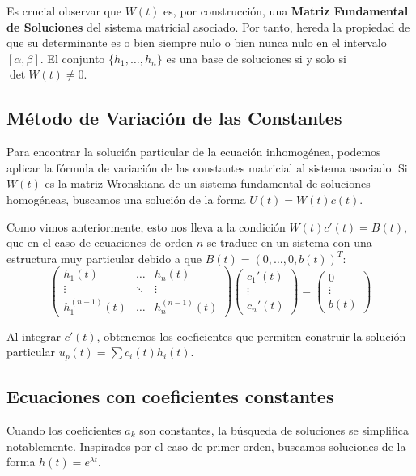 Es crucial observar que $W(t)$ es, por construcción, una \textbf{Matriz Fundamental de Soluciones} del sistema matricial asociado. Por tanto, hereda la propiedad de que su determinante es o bien siempre nulo o bien nunca nulo en el intervalo $[\alpha, \beta]$. El conjunto $\{h_1, \dots, h_n\}$ es una base de soluciones si y solo si $\det W(t) \neq 0$.

\subsection{Método de Variación de las Constantes}

Para encontrar la solución particular de la ecuación inhomogénea, podemos aplicar la fórmula de variación de las constantes matricial al sistema asociado. Si $W(t)$ es la matriz Wronskiana de un sistema fundamental de soluciones homogéneas, buscamos una solución de la forma $U(t) = W(t)c(t)$.

Como vimos anteriormente, esto nos lleva a la condición $W(t)c'(t) = B(t)$, que en el caso de ecuaciones de orden $n$ se traduce en un sistema con una estructura muy particular debido a que $B(t) = (0, \dots, 0, b(t))^T$:
\[
\begin{pmatrix} 
h_1(t) & \dots & h_n(t) \\ 
\vdots & \ddots & \vdots \\ 
h_1^{(n-1)}(t) & \dots & h_n^{(n-1)}(t) 
\end{pmatrix} \begin{pmatrix} c_1'(t) \\ \vdots \\ c_n'(t) \end{pmatrix} = \begin{pmatrix} 0 \\ \vdots \\ b(t) \end{pmatrix}
\]

Al integrar $c'(t)$, obtenemos los coeficientes que permiten construir la solución particular $u_p(t) = \sum c_i(t) h_i(t)$.

\subsection{Ecuaciones con coeficientes constantes}

Cuando los coeficientes $a_k$ son constantes, la búsqueda de soluciones se simplifica notablemente. Inspirados por el caso de primer orden, buscamos soluciones de la forma $h(t) = e^{\lambda t}$.

